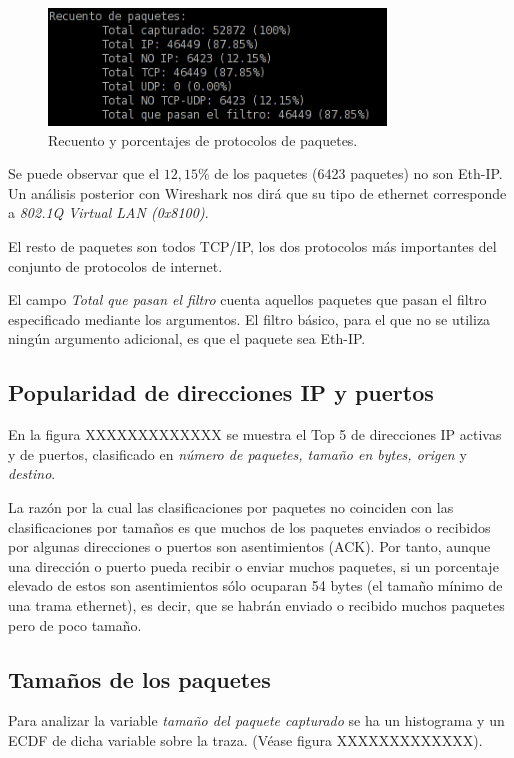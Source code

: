 \documentclass[a4paper, 11pt]{article}	%
\begin{document}
\begin{figure}[h]
\centering
\includegraphics[width=0.8\textwidth]{recuento.png}
\caption{Recuento y porcentajes de protocolos de paquetes.}
\label{fig:recuento}
\end{figure}

Se puede observar que el $12,15\%$ de los paquetes (6423 paquetes) no son Eth-IP. Un análisis posterior con Wireshark nos dirá que su tipo de ethernet corresponde a \textit{802.1Q Virtual LAN (0x8100)}.

El resto de paquetes son todos TCP/IP, los dos protocolos más importantes del conjunto de protocolos de internet.

El campo \textit{Total que pasan el filtro} cuenta aquellos paquetes que pasan el filtro especificado mediante los argumentos. El filtro básico, para el que no se utiliza ningún argumento adicional, es que el paquete sea Eth-IP.

\subsection{Popularidad de direcciones IP y puertos}
En la figura XXXXXXXXXXXXX se muestra el Top 5 de direcciones IP activas y de puertos, clasificado en \textit{número de paquetes, tamaño en bytes, origen} y \textit{destino}.

La razón por la cual las clasificaciones por paquetes no coinciden con las clasificaciones por tamaños es que muchos de los paquetes enviados o recibidos por algunas direcciones o puertos son asentimientos (ACK). Por tanto, aunque una dirección o puerto pueda recibir o enviar muchos paquetes, si un porcentaje elevado de estos son asentimientos sólo ocuparan 54 bytes (el tamaño mínimo de una trama ethernet), es decir, que se habrán enviado o recibido muchos paquetes pero de poco tamaño.

\subsection{Tamaños de los paquetes}
Para analizar la variable \textit{tamaño del paquete capturado} se ha un histograma y un ECDF de  dicha variable sobre la traza. (Véase figura XXXXXXXXXXXXX).
\end{document}

